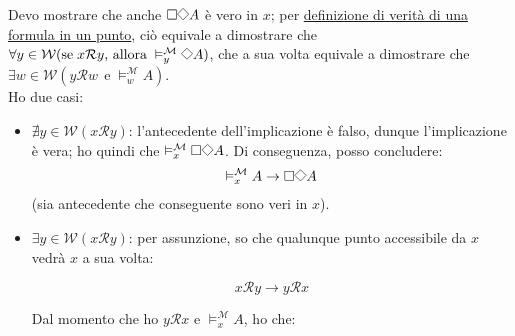 \documentclass[a4paper,12pt]{article}
\newcommand{\Dmd}{\mathord{\vcenter{\hbox{\tikz[baseline=-0.6ex]{\draw[line width=0.4pt, scale=1, rotate=45] (0,0) rectangle (0.2,0.2);}}}}} %
\begin{document}
\begin{dimo}
\begin{enumerate}
		Devo mostrare che anche $\Box \Dmd A$ è vero in $x$; per \hyperlink{defverp}{definizione di verità di una formula in un punto}, ciò equivale a dimostrare che $\forall y \in \mathcal{W} (\text{se} \; x\mathcal{R}y  \text{, allora} \; \vDash_y^{\mathcal{M}} \Dmd A)$, che a sua volta equivale a dimostrare che $\exists w \in \mathcal{W} (y\mathcal{R}w \;\, \text{e} \; \vDash_w^{\mathcal{M}} A)$.\\
		Ho due casi: 
		\begin{itemize}
			\item $\nexists y \in \mathcal{W} (x\mathcal{R}y)$: l'antecedente dell'implicazione è falso, dunque l'implicazione è vera; ho quindi che $\vDash_x^{\mathcal{M}} \Box \Dmd A$. Di conseguenza, posso concludere:
			$$\vDash_x^{\mathcal{M}} A \to \Box \Dmd A$$
			(sia antecedente che conseguente sono veri in $x$).
			\item $\exists y \in \mathcal{W} (x\mathcal{R}y)$: per assunzione, so che qualunque punto accessibile da $x$ vedrà $x$ a sua volta: 
			
			\begin{minipage}{0.48\textwidth}
				$$x\mathcal{R}y \to y\mathcal{R}x$$
			\end{minipage}
			\begin{minipage}{0.48\textwidth}
				\begin{center}
				\end{center}
			\end{minipage}
			\vspace{0pt}
			
			Dal momento che ho $y\mathcal{R}x$ e $\vDash_x^{\mathcal{M}} A$, ho che: \\
			

\end{itemize}
\end{enumerate}
\end{dimo}
\end{document}
